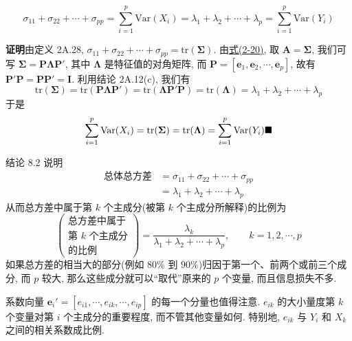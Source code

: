 
\[
\sigma_{11}+\sigma_{22}+\cdots+\sigma_{pp}=\sum_{i=1}^{p}\mathrm{Var}(X_i)=\lambda_1+\lambda_2+\cdots+\lambda_p=\sum_{i=1}^{p}\mathrm{Var}(Y_i)
\]

\noindent\textbf{证明}\quad 由定义 2A.28, $\sigma_{11}+\sigma_{22}+\cdots+\sigma_{pp}=\mathrm{tr}(\boldsymbol{\Sigma})$. 由\hyperref[eq:2-20]{式(2-20)}, 取 $\boldsymbol{A}=\boldsymbol{\Sigma}$, 我们可写 $\boldsymbol{\Sigma}=\boldsymbol{P}\boldsymbol{\Lambda}\boldsymbol{P}'$, 其中 $\boldsymbol{\Lambda}$ 是特征值的对角矩阵, 而 $\boldsymbol{P}=[\boldsymbol{e}_1,\boldsymbol{e}_2,\cdots,\boldsymbol{e}_p]$, 故有 $\boldsymbol{P}'\boldsymbol{P}=\boldsymbol{P}\boldsymbol{P}'=\boldsymbol{I}$. 利用结论 2A.12(c), 我们有
\[
\mathrm{tr}(\boldsymbol{\Sigma})=\mathrm{tr}(\boldsymbol{P}\boldsymbol{\Lambda}\boldsymbol{P}')=\mathrm{tr}(\boldsymbol{\Lambda}\boldsymbol{P}'\boldsymbol{P})=\mathrm{tr}(\boldsymbol{\Lambda})=\lambda_1+\lambda_2+\cdots+\lambda_p
\]
于是
\[
\sum_{i=1}^{p}\mathrm{Var}(X_i)=\mathrm{tr}(\boldsymbol{\Sigma})=\mathrm{tr}(\boldsymbol{\Lambda})=\sum_{i=1}^{p}\mathrm{Var}(Y_i) \hfill\blacksquare
\]

结论 8.2 说明
\label{eq:8-6}
\begin{equation}
\begin{aligned}
\text{总体总方差}&=\sigma_{11}+\sigma_{22}+\cdots+\sigma_{pp}\\
&=\lambda_1+\lambda_2+\cdots+\lambda_p
\end{aligned}
\tag{8-6}
\end{equation}
从而总方差中属于第 $k$ 个主成分(被第 $k$ 个主成分所解释)的比例为
\label{eq:8-7}
\begin{equation}
\left(\begin{array}{c}
\text{总方差中属于}\\
\text{第 }k\text{ 个主成分}\\
\text{的比例}
\end{array}\right)=\frac{\lambda_k}{\lambda_1+\lambda_2+\cdots+\lambda_p},\qquad k=1,2,\cdots,p
\tag{8-7}
\end{equation}
如果总方差的相当大的部分(例如 $80\%$ 到 $90\%$)归因于第一个、前两个或前三个成分, 而 $p$ 较大, 那么这些成分就可以“取代”原来的 $p$ 个变量, 而且信息损失不多.

系数向量 $\mathbf{e}_i'=[e_{i1},\cdots,e_{ik},\cdots,e_{ip}]$ 的每一个分量也值得注意. $e_{ik}$ 的大小量度第 $k$ 个变量对第 $i$ 个主成分的重要程度, 而不管其他变量如何. 特别地, $e_{ik}$ 与 $Y_i$ 和 $X_k$ 之间的相关系数成比例.

